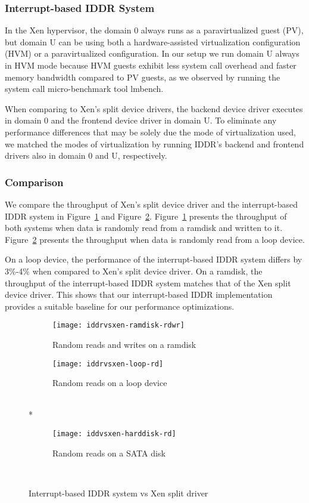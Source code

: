\subsubsection*{Interrupt-based IDDR System}
In the Xen hypervisor, the domain 0 always runs as a paravirtualized guest (PV),
but domain U can be using both a hardware-assisted virtualization configuration (HVM) 
or a paravirtualized configuration.  In our setup we run domain U always
in HVM mode because HVM guests exhibit less system call overhead
and faster memory bandwidth compared to PV guests, as we observed
by running the system call micro-benchmark tool lmbench\cite{lmbench}. 

When comparing to Xen's split device drivers, the backend device driver executes
in domain 0 and the frontend device driver in domain U.  
To eliminate any performance differences that may be solely due the mode
of virtualization used, we matched the modes of virtualization
by running IDDR's backend and frontend drivers also in 
domain 0 and U, respectively.

\subsubsection*{Comparison}
We compare the throughput of Xen's split device driver and the
interrupt-based IDDR system in Figure~\ref{fig:iddrvsxen-ramdisk-rdwr}
and Figure~\ref{fig:iddrvsxen-loop-rd}. 
Figure~\ref{fig:iddrvsxen-ramdisk-rdwr} presents the
throughput of both systems when data is randomly read from a ramdisk and
written to it. Figure~\ref{fig:iddrvsxen-loop-rd} presents the throughput
when data is randomly read from a loop device.

On a loop device, the performance of the interrupt-based IDDR system
differs by 3\%-4\% when compared to Xen's split device driver. On a
ramdisk, the throughput of the interrupt-based IDDR system matches that
of the Xen split device driver. This shows that our interrupt-based
IDDR implementation provides a suitable baseline for our performance 
optimizations.

\begin{figure}[!ht]
  \begin{subfigure}[b]{0.2\textwidth}
  \texttt{[image: iddrvsxen-ramdisk-rdwr]}
  \caption{Random reads and writes on a ramdisk}
  \label{fig:iddrvsxen-ramdisk-rdwr}
  \end{subfigure}
  \hspace{50mm}
  \begin{subfigure}[b]{0.2\textwidth}
  \texttt{[image: iddrvsxen-loop-rd]}
  \caption{Random reads on a loop device}
  \label{fig:iddrvsxen-loop-rd}
  \end{subfigure}\\*
  \hspace{150mm}
  \begin{subfigure}[b]{0.2\textwidth}
  \texttt{[image: iddvsxen-harddisk-rd]}
  \caption{Random reads on a SATA disk}
  \label{fig:iddrvsxen-harddisk-rd}
  \end{subfigure}\\
\caption{Interrupt-based IDDR system vs Xen split driver}\label{fig:seqloopdisk}
\end{figure}

